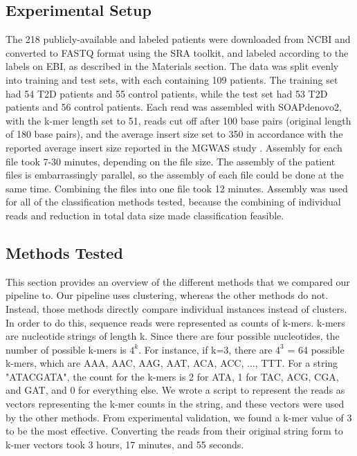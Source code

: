 
\subsection{Experimental Setup}

The 218 publicly-available and labeled patients were downloaded from NCBI and converted to FASTQ format using the SRA toolkit, and labeled according to the labels on EBI, as described in the Materials section. The data was split evenly into training and test sets, with each containing 109 patients. The training set had 54 T2D patients and 55 control patients, while the test set had 53 T2D patients and 56 control patients. Each read was assembled with SOAPdenovo2, with the k-mer length set to 51, reads cut off after 100 base pairs (original length of 180 base pairs), and the average insert size set to 350 in accordance with the reported average insert size reported in the MGWAS study \cite{qin041012}. Assembly for each file took 7-30 minutes, depending on the file size. The assembly of the patient files is embarrassingly parallel, so the assembly of each file could be done at the same time. Combining the files into one file took 12 minutes. Assembly was used for all of the classification methods tested, because the combining of individual reads and reduction in total data size made classification feasible.

\subsection{Methods Tested}

This section provides an overview of the different methods that we compared our pipeline to. Our pipeline uses clustering, whereas the other methods do not. Instead, those methods directly compare individual instances instead of clusters. In order to do this, sequence reads were represented as counts of k-mers. k-mers are nucleotide strings of length k. Since there are four possible nucleotides, the number of possible k-mers is \(4^k\). For instance, if k=3, there are \(4^3\) = 64 possible k-mers, which are AAA, AAC, AAG, AAT, ACA, ACC, ..., TTT. For a string "ATACGATA", the count for the k-mers is 2 for ATA, 1 for TAC, ACG, CGA, and GAT, and 0 for everything else. We wrote a script to represent the reads as vectors representing the k-mer counts in the string, and these vectors were used by the other methods. From experimental validation, we found a k-mer value of 3 to be the most effective. Converting the reads from their original string form to k-mer vectors took 3 hours, 17 minutes, and 55 seconds.


